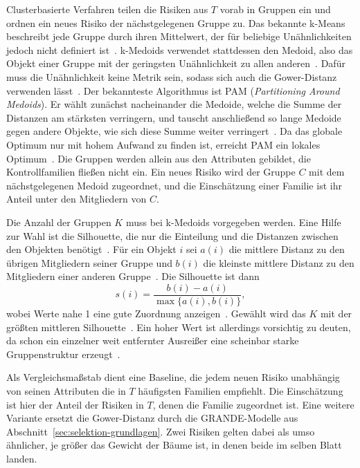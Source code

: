 Clusterbasierte Verfahren teilen die Risiken aus $T$ vorab in Gruppen ein und ordnen ein neues Risiko der nächstgelegenen Gruppe zu.
Das bekannte k-Means beschreibt jede Gruppe durch ihren Mittelwert, der für beliebige Unähnlichkeiten jedoch nicht definiert ist~\cite[S.~171]{Schubert2019}.
k-Medoids verwendet stattdessen den Medoid, also das Objekt einer Gruppe mit der geringsten Unähnlichkeit zu allen anderen~\cite[S.~171]{Schubert2019}.
Dafür muss die Unähnlichkeit keine Metrik sein, sodass sich auch die Gower-Distanz verwenden lässt~\cite[S.~173]{Schubert2019}.
Der bekannteste Algorithmus ist PAM (\emph{Partitioning Around Medoids}).
Er wählt zunächst nacheinander die Medoide, welche die Summe der Distanzen am stärksten verringern, und tauscht anschließend so lange Medoide gegen andere Objekte, wie sich diese Summe weiter verringert~\cite[S.~173]{Schubert2019}.
Da das globale Optimum nur mit hohem Aufwand zu finden ist, erreicht PAM ein lokales Optimum~\cite[S.~173]{Schubert2019}.
Die Gruppen werden allein aus den Attributen gebildet, die Kontrollfamilien fließen nicht ein.
Ein neues Risiko wird der Gruppe $C$ mit dem nächstgelegenen Medoid zugeordnet, und die Einschätzung einer Familie ist ihr Anteil unter den Mitgliedern von $C$.

Die Anzahl der Gruppen $K$ muss bei k-Medoids vorgegeben werden.
Eine Hilfe zur Wahl ist die Silhouette, die nur die Einteilung und die Distanzen zwischen den Objekten benötigt~\cite[S.~55]{Rousseeuw1987}.
Für ein Objekt $i$ sei $a(i)$ die mittlere Distanz zu den übrigen Mitgliedern seiner Gruppe und $b(i)$ die kleinste mittlere Distanz zu den Mitgliedern einer anderen Gruppe~\cite[S.~55]{Rousseeuw1987}.
Die Silhouette ist dann
\[
  s(i) = \frac{b(i) - a(i)}{\max\{a(i), b(i)\}},
\]
wobei Werte nahe 1 eine gute Zuordnung anzeigen~\cite[S.~56]{Rousseeuw1987}.
Gewählt wird das $K$ mit der größten mittleren Silhouette~\cite[S.~53]{Rousseeuw1987}.
Ein hoher Wert ist allerdings vorsichtig zu deuten, da schon ein einzelner weit entfernter Ausreißer eine scheinbar starke Gruppenstruktur erzeugt~\cite[S.~60]{Rousseeuw1987}.

Als Vergleichsmaßstab dient eine Baseline, die jedem neuen Risiko unabhängig von seinen Attributen die in $T$ häufigsten Familien empfiehlt.
Die Einschätzung ist hier der Anteil der Risiken in $T$, denen die Familie zugeordnet ist.
Eine weitere Variante ersetzt die Gower-Distanz durch die GRANDE-Modelle aus Abschnitt~\ref{sec:selektion-grundlagen}.
Zwei Risiken gelten dabei als umso ähnlicher, je größer das Gewicht der Bäume ist, in denen beide im selben Blatt landen.

